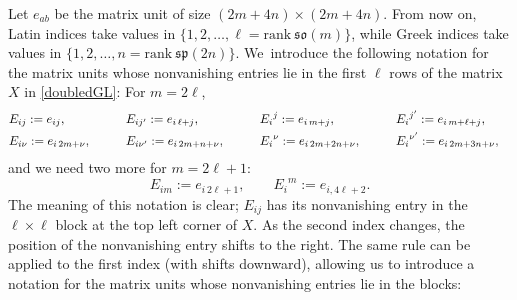 \documentclass[pdftex]{sigma}
\numberwithin{equation}{section}
\theoremstyle{definition}
\def\so{\mathfrak{so}}
\def\sp{\mathfrak{sp}}
\begin{document}
Let $ e_{ab}$ be the matrix unit of size $(2m+4n)\times (2m+4n)$.
From now on, Latin indices take values in $\{ 1, 2, \dots, \ell= \mathrm{rank}\ \so(m) \}$, while Greek indices take values in $\{ 1, 2, \dots, n = \mathrm{rank}\ \sp(2n) \}$.
We~introduce the following notation for the matrix units whose nonvanishing entries lie in the first $\ell $ rows of the matrix $ X $ in \eqref{doubledGL}: For $ m = 2\ell$,
\begin{alignat*}{5}
	&E_{ij}:= e_{ij}, \qquad&& E_{ij'}:= e_{i\, \ell+j}, \qquad&& {E_i}^j:= e_{i\, m+j},\qquad&& {E_{i}}^{j'}:= e_{i\, m+\ell+j},&
	\notag\\
&	E_{i\nu}:=e_{i\, 2m+\nu}, \qquad && E_{i\nu'}:= e_{i\, 2m+n+\nu}, \qquad && {E_i}^{\nu}:= e_{i\, 2m+2n+\nu}, \qquad && {E_i}^{\nu'}:= e_{i\, 2m+3n+\nu},&
\end{alignat*}
and we need two more for $m = 2\ell+1$:
\begin{equation*}
	E_{im} := e_{i\, 2\ell+1}, \qquad {E_i}^m := e_{i,4\ell+2}.
\end{equation*}
The meaning of this notation is clear; $E_{ij}$ has its nonvanishing entry in the $\ell \times \ell$ block at the top left corner of $X$.
As the second index changes, the position of the nonvanishing entry shifts to the right.
The same rule can be applied to the first index (with shifts downward), allowing us to introduce a notation for the matrix units whose nonvanishing entries lie in the blocks: %
\end{document}

